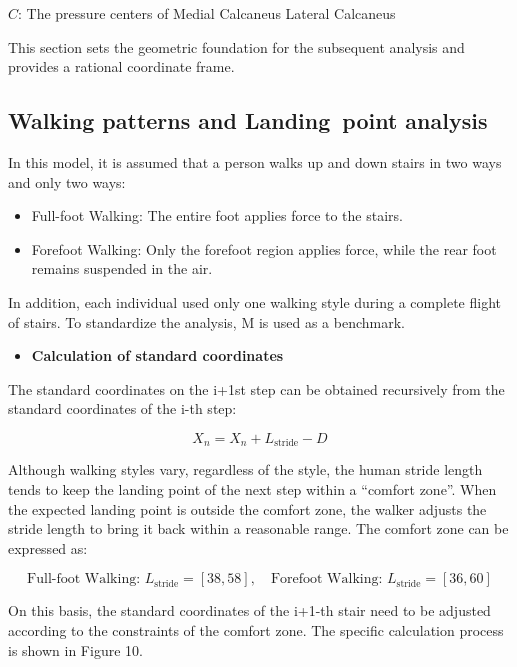 \documentclass{mcmthesis}
\begin{document}
  \(C\): The pressure centers of Medial Calcaneus Lateral Calcaneus 
  
  This section sets the geometric foundation for the subsequent analysis and provides a rational coordinate frame.
  
  
  \subsection{Walking patterns and Landing point analysis}
  
  In this model, it is assumed that a person walks up and down stairs in two ways and only two ways:
  
  \begin{itemize}
    \item Full-foot Walking: The entire foot applies force to the stairs.
  
    \item Forefoot Walking: Only the forefoot region applies force, while the rear foot remains suspended in the air.
  \end{itemize}
  
  
  In addition, each individual used only one walking style during a complete flight of stairs. To standardize the analysis, M is used as a benchmark.
  
  \begin{itemize}[label=$\diamond$]
  \item \textbf{Calculation of standard coordinates}
  \end{itemize}
  
  The standard coordinates on the i+1st step can be obtained recursively from the standard coordinates of the i-th step:
  
  \[
  X_n = X_n + L_{\text{stride}} - D
  \]
  
  
  Although walking styles vary, regardless of the style, the human stride length tends to keep the landing point of the next step within a “comfort zone”. When the expected landing point is outside the comfort zone, the walker adjusts the stride length to bring it back within a reasonable range. The comfort zone can be expressed as:
  
\[
\text{Full-foot Walking: } L_{\text{stride}} = [38, 58], \quad \text{Forefoot Walking: } L_{\text{stride}} = [36, 60]
\]


  On this basis, the standard coordinates of the i+1-th stair need to be adjusted according to the constraints of the comfort zone. The specific calculation process is shown in Figure 10. 
  
\end{document}
